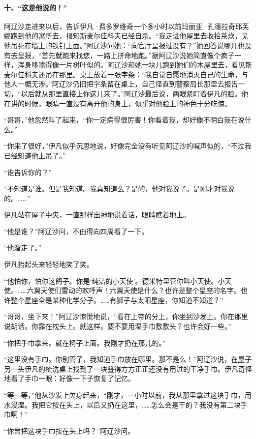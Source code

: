\paragraph*{十、“这是他说的！”}
\par 阿辽沙走进来以后，告诉伊凡·费多罗维奇一个多小时以前玛丽亚·孔德拉奇耶芙娜跑到他的寓所去，报知斯麦尔佳科夫已经自杀。“我走进他屋里去收拾茶炊，见他吊死在墙上的铁钉上面。”阿辽沙问她：“向官厅呈报过没有？”她回答说哪儿也没有去呈报，“首先就跑来找您，一路上拼命地跑。”据阿辽沙说她简直像个疯子一样，浑身哆嗦得像一片树叶似的。阿辽沙和她一块儿跑到她们的木屋里去，看见斯麦尔佳科夫还吊在那里。桌上放着一张字条：“我自觉自愿地消灭自己的生命，与他人一概无涉。”阿辽沙仍旧把字条留在桌上，自己径直到警察局长那里去报告一切，“以后就从那里直接上你这儿来了。”阿辽沙最后说，两眼紧盯着伊凡的脸。他在讲的时候，眼睛一直没有离开他的身上，似乎对他脸上的神色十分吃惊。
\par “哥哥，”他忽然叫了起来，“你一定病得很厉害！你看着我，却好像不明白我在说什么。”
\par “你来了很好，”伊凡似乎沉思地说，好像完全没有听见阿辽沙的喊声似的，“不过我已经知道他上吊了。”
\par “谁告诉你的？”
\par “不知道是谁。但是我知道。我真知道么？是的，他对我说了。是刚才对我说的。……”
\par 伊凡站在屋子中央，一直那样出神地说着话，眼睛瞧着地上。
\par “他是谁？”阿辽沙问，不由得向四周看了一下。
\par “他溜走了。”
\par 伊凡抬起头来轻轻地笑了笑。
\par “他怕你，怕你这鸽子。你是‘纯洁的小天使’。德米特里管你叫小天使。小天使。……六翼天使们雷动的欢呼声！六翼天使是什么？也许是整个星座的名字。也许整个星座全是某种化学分子。……有狮子与太阳星座，你知道不知道？”
\par “哥哥，坐下来！”阿辽沙惊慌地说，“看在上帝的分上，你坐到沙发上。你在那里说胡话。你靠在枕头上。就这样。要不要用湿手巾敷敷头？也许会好一些。”
\par “你把手巾拿来。就在椅子上面。我刚才扔在那儿的。”
\par “这里没有手巾。你别管了，我知道手巾放在哪里。那不是么！”阿辽沙说，在屋子另一头伊凡的梳洗桌上找到了一块叠得方方正正还没有用过的干净手巾。伊凡奇怪地看了手巾一眼：好像一下子恢复了记忆。
\par “等一等，”他从沙发上欠身起来，“刚才，一小时以前，我从那里拿过这块手巾，用水浸湿。我把它按在头上，以后又扔在这里，……怎么会是干的？我没有第二块手巾啊！”
\par “你曾把这块手巾按在头上吗？”阿辽沙问。
